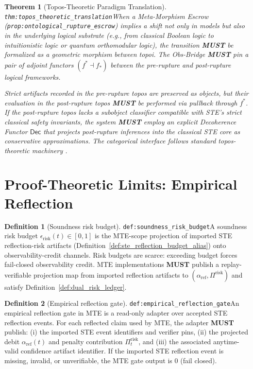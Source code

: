 \documentclass[11pt]{article}
\theoremstyle{definition}
\newtheorem{definition}{Definition}
\theoremstyle{plain}
\newtheorem{theorem}{Theorem}
\newcommand{\MUST}{\textbf{MUST}}
\newcommand{\STE}{\textsf{STE}}
\newcommand{\MTE}{\textsf{MTE}}
\newcommand{\lbl}[1]{\texttt{\footnotesize\nolinkurl{#1}}}
\newcommand{\DefLabel}[1]{\hfill{\small\lbl{#1}}}
\newcommand{\erisk}{\epsilon_{\mathrm{risk}}}
\newcommand{\PiRisk}{\Pi^{\mathrm{risk}}}
\begin{document}

\begin{theorem}[Topos-Theoretic Paradigm Translation]\DefLabel{thm:topos_theoretic_translation}\label{thm:topos_theoretic_translation}
When a Meta-Morphism Escrow (\lbl{prop:ontological_rupture_escrow}) implies a shift not only in models but also in the underlying logical substrate (e.g., from classical Boolean logic to intuitionistic logic or quantum orthomodular logic), the transition \MUST{} be formalized as a \emph{geometric morphism} between topoi.
The Obs-Bridge \MUST{} pin a pair of adjoint functors $(f^\ast \dashv f_\ast)$ between the pre-rupture and post-rupture logical frameworks.

Strict artifacts recorded in the pre-rupture topos are preserved as objects, but their evaluation in the post-rupture topos \MUST{} be performed via pullback through $f^\ast$.
If the post-rupture topos lacks a subobject classifier compatible with \STE{}'s strict classical safety invariants, the system \MUST{} employ an explicit \emph{Decoherence Functor} $\mathsf{Dec}$ that projects post-rupture inferences into the classical \STE{} core as conservative approximations.
The categorical interface follows standard topos-theoretic machinery \cite{MacLaneMoerdijk1994}.
\end{theorem}

\section{Proof-Theoretic Limits: Empirical Reflection}\label{sec:reflection}
\begin{definition}[Soundness risk budget]\DefLabel{def:soundness_risk_budget}\label{def:soundness_risk_budget}
A soundness risk budget $\erisk(t)\in[0,1]$ is the \MTE{}-scope projection of imported \STE{} reflection-risk artifacts (Definition~\ref{def:ste_reflection_budget_alias}) onto observability-credit channels.
Risk budgets are scarce: exceeding budget forces fail-closed observability credit.
\MTE{} implementations \MUST{} publish a replay-verifiable projection map from imported reflection artifacts to $(\alpha_{\mathrm{ref}},\PiRisk)$ and satisfy Definition~\ref{def:dual_risk_ledger}.
\end{definition}

\begin{definition}[Empirical reflection gate]\DefLabel{def:empirical_reflection_gate}\label{def:empirical_reflection_gate}
An empirical reflection gate in \MTE{} is a read-only adapter over accepted \STE{} reflection events.
For each reflected claim used by \MTE{}, the adapter \MUST{} publish:
(i) the imported \STE{} event identifiers and verifier pins,
(ii) the projected debit $\alpha_{\mathrm{ref}}(t)$ and penalty contribution $\PiRisk_t$,
and (iii) the associated anytime-valid confidence artifact identifier.
If the imported \STE{} reflection event is missing, invalid, or unverifiable, the \MTE{} gate output is $0$ (fail closed).
\end{definition}
\end{document}
